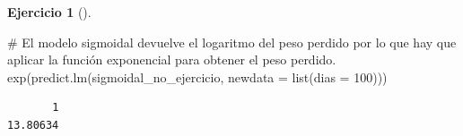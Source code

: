 \documentclass[
  a4paper,
]{scrreport}
\newenvironment{Shaded}{\begin{snugshade}}{\end{snugshade}}
\newcommand{\AttributeTok}[1]{\textcolor[rgb]{0.40,0.45,0.13}{#1}}
\newcommand{\CommentTok}[1]{\textcolor[rgb]{0.37,0.37,0.37}{#1}}
\newcommand{\DecValTok}[1]{\textcolor[rgb]{0.68,0.00,0.00}{#1}}
\newcommand{\FunctionTok}[1]{\textcolor[rgb]{0.28,0.35,0.67}{#1}}
\newcommand{\NormalTok}[1]{\textcolor[rgb]{0.00,0.23,0.31}{#1}}
\theoremstyle{definition}
\newtheorem{exercise}{Ejercicio}[chapter]
\theoremstyle{remark}
\begin{document}
\begin{exercise}[]
\begin{enumerate}
\begin{tcolorbox}
\begin{Shaded}
\begin{Highlighting}[]
\CommentTok{\# El modelo sigmoidal devuelve el logaritmo del peso perdido por lo que hay que aplicar la función exponencial para obtener el peso perdido.}
\FunctionTok{exp}\NormalTok{(}\FunctionTok{predict.lm}\NormalTok{(sigmoidal\_no\_ejercicio, }\AttributeTok{newdata =} \FunctionTok{list}\NormalTok{(}\AttributeTok{dias =} \DecValTok{100}\NormalTok{)))}
\end{Highlighting}
\end{Shaded}

\begin{verbatim}
       1 
13.80634 
\end{verbatim}

  \end{tcolorbox}
\end{enumerate}

\end{exercise}
\end{document}
